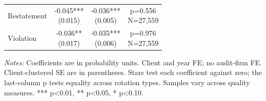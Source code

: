 \documentclass[10pt]{article}
\begin{document}
\begin{minipage}{19cm}
\begin{threeparttable}
\begin{tabular}{p{}ccc}
Restatement & \shortstack{-0.045***\\(0.015)} & \shortstack{-0.036***\\(0.005)} & \shortstack{p=0.556\\N=27,559} \\
Violation & \shortstack{-0.036**\\(0.017)} & \shortstack{-0.035***\\(0.006)} & \shortstack{p=0.976\\N=27,559} \\
\bottomrule
\end{tabular}
\begin{tablenotes}\fontsize{9}{11}\selectfont
\item \raggedright \fontsize{9}{11}\selectfont \textit{Notes:} Coefficients are in probability units. Client and year FE; no audit-firm FE. Client-clustered SE are in parentheses. Stars test each coefficient against zero; the last-column p tests equality across rotation types. Samples vary across quality measures. *** p<0.01, ** p<0.05, * p<0.10.
\end{tablenotes}
\end{threeparttable}

\end{minipage}
\end{document}
